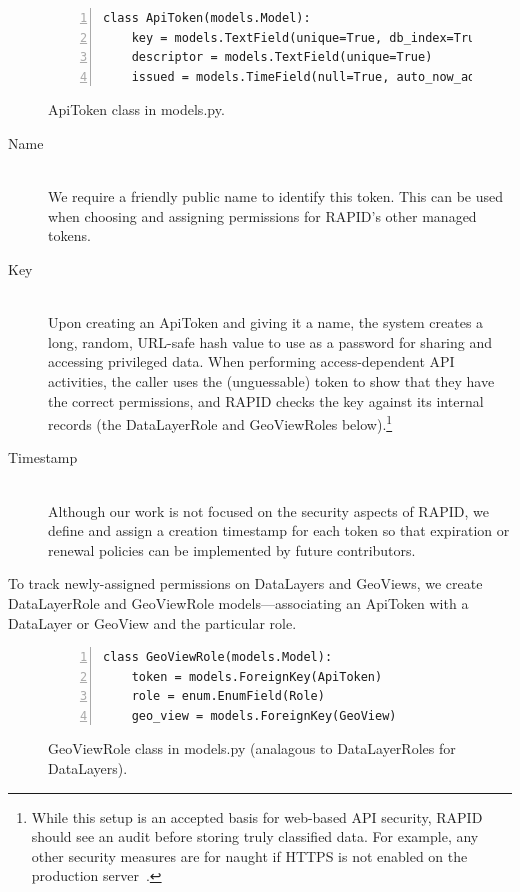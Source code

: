\begin{figure}[ht]
\begin{Verbatim}[samepage=true,baselinestretch=1,numbers=left,xleftmargin=12mm]
class ApiToken(models.Model):
    key = models.TextField(unique=True, db_index=True)
    descriptor = models.TextField(unique=True)
    issued = models.TimeField(null=True, auto_now_add=True)
\end{Verbatim}
\label{fig:apitoken}
\caption{ApiToken class in models.py.}
\end{figure}

\begin{description}
\item[Name] \hfill \\
We require a friendly public name to identify this token. This can be used when choosing and assigning permissions for RAPID's other managed tokens.

\item[Key] \hfill \\
Upon creating an ApiToken and giving it a name, the system creates a long, random, URL-safe hash value to use as a password for sharing and accessing privileged data. When performing access-dependent API activities, the caller uses the (unguessable) token to show that they have the correct permissions, and RAPID checks the key against its internal records (the DataLayerRole and GeoViewRoles below).\footnote{While this setup is an accepted basis for web-based API security, RAPID should see an audit before storing truly classified data. For example, any other security measures are for naught if HTTPS is not enabled on the production server~\cite{Stormpath,Palmer}. }

\item[Timestamp] \hfill \\
Although our work is not focused on the security aspects of RAPID, we define and assign a creation timestamp for each token so that expiration or renewal policies can be implemented by future contributors.

\end{description}
To track newly-assigned permissions on DataLayers and GeoViews, we create DataLayerRole and GeoViewRole models---associating an ApiToken with a DataLayer or GeoView and the particular role.

\begin{figure}[ht]
\begin{Verbatim}[samepage=true,baselinestretch=1,numbers=left,xleftmargin=12mm]
class GeoViewRole(models.Model):
    token = models.ForeignKey(ApiToken)
    role = enum.EnumField(Role)
    geo_view = models.ForeignKey(GeoView)
\end{Verbatim}
\caption{GeoViewRole class in models.py (analagous to DataLayerRoles for DataLayers).}
\label{fig:geoviewrole}
\end{figure}

